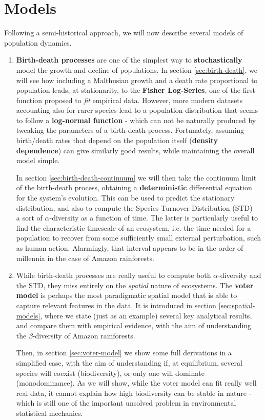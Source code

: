 \documentclass[../../main.tex]{subfiles}
\begin{document}
\section{Models}
Following a semi-historical approach, we will now describe several models of population dynamics.
\begin{enumerate}
    \item \textbf{Birth-death processes} are one of the simplest way to \textbf{stochastically} model the growth and decline of populations. In section \ref{sec:birth-death}, we will see how including a Malthusian growth and a death rate proportional to population leads, at stationarity, to the \textbf{Fisher Log-Series}, one of the first function proposed to \textit{fit} empirical data. However, more modern datasets accounting also for rarer species lead to a population distribution that seems to follow a \textbf{log-normal function} - which can not be naturally produced by tweaking the parameters of a birth-death process. Fortunately, assuming birth/death rates that depend on the population itself (\textbf{density dependence}) can give similarly good results, while maintaining the overall model simple.
    
    \medskip

    In section \ref{sec:birth-death-continuum} we will then take the continuum limit of the birth-death process, obtaining a \textbf{deterministic} differential equation for the system's evolution. This can be used to predict the stationary distribution, and also to compute the Species Turnover Distribution (STD) - a sort of $\alpha$-diversity as a function of time. The latter is particularly useful to find the characteristic timescale of an ecosystem, i.e. the time needed for a population to recover from some sufficiently small external perturbation, such as human action. Alarmingly, that interval appears to be in the order of millennia in the case of Amazon rainforests.
    \item While birth-death processes are really useful to compute both $\alpha$-diversity and the STD, they miss entirely on the \textit{spatial} nature of ecosystems. The \textbf{voter model} is perhaps the most paradigmatic spatial model that is able to capture relevant features in the data. It is introduced in section \ref{sec:spatial-models}, where we state (just as an example) several key analytical results, and compare them with empirical evidence, with the aim of understanding the $\beta$-diversity of Amazon rainforests.
    
    \medskip

    Then, in section \ref{sec:voter-model} we show some full derivations in a simplified case, with the aim of understanding if, at equilibrium, several species will coexist (biodiversity), or only one will dominate (monodominance). As we will show, while the voter model can fit really well real data, it cannot explain how high biodiversity can be stable in nature - which is still one of the important unsolved problem in environmental statistical mechanics.
\end{enumerate} %
\end{document}
